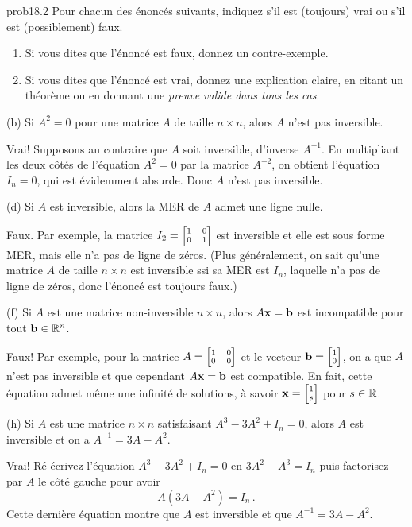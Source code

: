 \bigskip
\begin{sol}{prob18.2}  Pour chacun des énoncés suivants, indiquez s'il est (toujours) vrai ou s'il est (possiblement) faux.   
   \smallskip    
\begin{enumerate}[$\bullet$]
\item Si vous dites que l'\'enonc\'e est faux, donnez un contre-exemple.   
\item Si vous dites que l'\'enonc\'e est vrai, donnez une explication claire, en citant un théorème ou en donnant une {\it preuve valide dans tous les cas}. 
\end{enumerate}


\medskip
(b)    Si $A^2=0$ pour une matrice $A$ de taille $n\times n$, alors $A$ n'est pas inversible.

\soln Vrai! Supposons au contraire que $A$ soit inversible, d'inverse $A^{-1}$. En multipliant les deux côtés de l'équation $A^2=0$ par la matrice $A^{-2}$, on obtient l'équation $I_n=0$, qui est évidemment absurde. Donc $A$ n'est pas inversible.
\medskip
 

(d)  Si $A$ est inversible, alors la MER de $A$ admet une ligne nulle.

\soln Faux. Par exemple, la matrice $I_2 =\scriptsize\bmatrix 1&0\\0&1\endbmatrix$ est inversible et elle est sous forme MER, mais elle n'a pas de ligne de zéros. (Plus généralement, on sait qu'une matrice $A$  de taille $n \times n$ est inversible ssi sa MER est $I_n$, laquelle n'a pas de ligne de zéros, donc l'énoncé est toujours faux.)
\medskip
 


(f) Si $ A $ est une matrice non-inversible $ n\times n$, alors $A\mathbf{x}=\mathbf{b}$ est incompatible pour tout $\mathbf{b} \in \mathbb{R}^n$.

\soln Faux! Par exemple, pour la matrice $A=\scriptsize\bmatrix 1&0\\0&0
\endbmatrix$ et le vecteur $\bb=\scriptsize\bmatrix 1\\0
\endbmatrix$, on a que $A$ n'est pas inversible et que cependant $A\mathbf{x}=\mathbf{b}$ est compatible. En fait, cette équation admet même une  infinité de solutions, \`a savoir $\xx=\scriptsize\bmatrix 1\\s
\endbmatrix$ pour $s\in \mathbb{R}$.
\medskip
 

(h) Si $A$ est une matrice $ n\times n$  satisfaisant $A^{3}-3A^{2}+I_{n}=0$, alors $A$ est inversible et on a  $A^{-1}=3A-A^{2}$.

\soln Vrai! R\'e-\'ecrivez l'\'equation $A^{3}-3A^{2}+I_{n}=0$ en $3A^{2}-A^3=I_{n}$ puis factorisez par $A$ le côté gauche pour avoir $$A(3A-A^2)=I_{n}\,.$$  
Cette derni\`ere \'equation montre que $A$ est inversible et que $A^{-1}=3A-A^{2}$.
\medskip

\end{sol}

